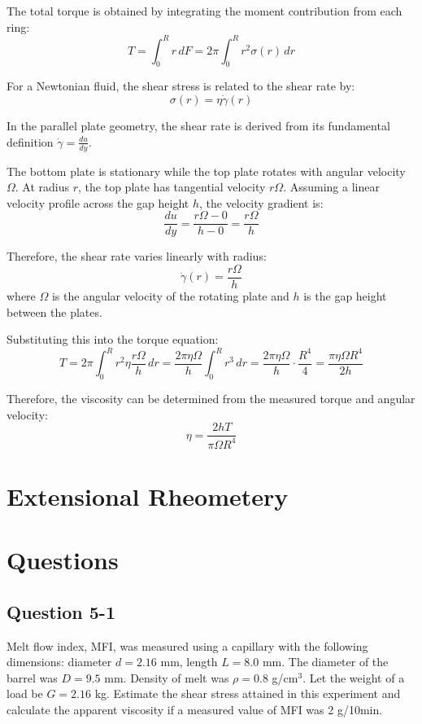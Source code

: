 The total torque is obtained by integrating the moment contribution from each ring:
\begin{equation}
	T = \int_0^R r \, dF = 2\pi \int_0^R r^2 \sigma(r) \, dr
\end{equation}

For a Newtonian fluid, the shear stress is related to the shear rate by:
\begin{equation}
	\sigma(r) = \eta \dot{\gamma}(r)
\end{equation}

In the parallel plate geometry, the shear rate is derived from its fundamental definition $\dot{\gamma} = \frac{du}{dy}$. 

The bottom plate is stationary while the top plate rotates with angular velocity $\Omega$. At radius $r$, the top plate has tangential velocity $r\Omega$. Assuming a linear velocity profile across the gap height $h$, the velocity gradient is:
$$\frac{du}{dy} = \frac{r\Omega - 0}{h - 0} = \frac{r\Omega}{h}$$

Therefore, the shear rate varies linearly with radius:
\begin{equation}
	\dot{\gamma}(r) = \frac{r\Omega}{h}
\end{equation}
where $\Omega$ is the angular velocity of the rotating plate and $h$ is the gap height between the plates.

Substituting this into the torque equation:
\begin{equation}
	T = 2\pi \int_0^R r^2 \eta \frac{r\Omega}{h} \, dr = \frac{2\pi \eta \Omega}{h} \int_0^R r^3 \, dr = \frac{2\pi \eta \Omega}{h} \cdot \frac{R^4}{4} = \frac{\pi \eta \Omega R^4}{2h}
\end{equation}

Therefore, the viscosity can be determined from the measured torque and angular velocity:
\begin{equation}
	\eta = \frac{2hT}{\pi \Omega R^4}
\end{equation}

\section{Extensional Rheometery}

\section{Questions}

\subsection*{Question 5-1}
Melt flow index, MFI, was measured using a capillary with the following dimensions: diameter $d = 2.16$ mm, length $L = 8.0$ mm. The diameter of the barrel was $D = 9.5$ mm. Density of melt was $\rho = 0.8$ g/cm$^3$. Let the weight of a load be $G = 2.16$ kg. Estimate the shear stress attained in this experiment and calculate the apparent viscosity if a measured value of MFI was 2 g/10min.

